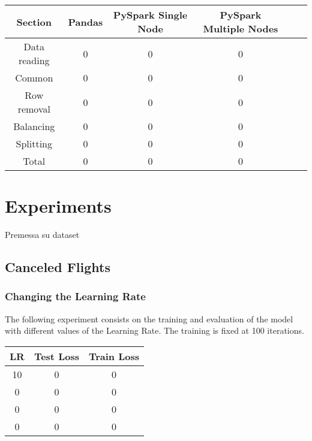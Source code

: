 \documentclass[
	letterpaper, %
	10pt, %
]{class}
\begin{document}
\begin{center}
	\begin{tabular}{ |c|c|c|c|c|c| }
		\hline
		Section      & Pandas & PySpark Single Node & PySpark Multiple Nodes \\
		\hline
		Data reading & 0      & 0                   & 0                      \\
		Common       & 0      & 0                   & 0                      \\
		Row removal  & 0      & 0                   & 0                      \\
		Balancing    & 0      & 0                   & 0                      \\
		Splitting    & 0      & 0                   & 0                      \\
		Total        & 0      & 0                   & 0                      \\

		\hline
	\end{tabular}
\end{center}


\section{Experiments}

Premessa su dataset

\subsection{Canceled Flights}

\subsubsection{Changing the Learning Rate}

The following experiment consists on the training and evaluation of the model with different values of the Learning Rate. The training is fixed at 100 iterations.

\begin{center}
	\begin{tabular}{ |c|c|c| }
		\hline
		LR & Test Loss & Train Loss \\
		\hline
		10 & 0         & 0          \\
		0  & 0         & 0          \\
		0  & 0         & 0          \\
		0  & 0         & 0          \\
		\hline
	\end{tabular}
\end{center}
\end{document}
